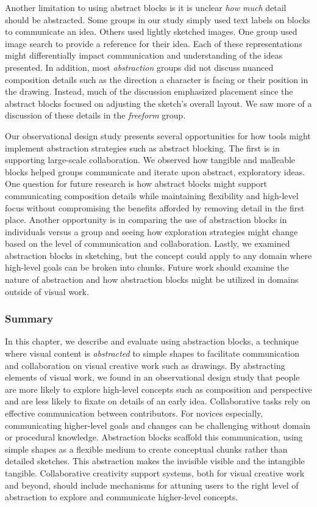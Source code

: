 Another limitation to using abstract blocks is it is unclear \textit{how much} detail should be abstracted. Some groups in our study simply used text labels on blocks to communicate an idea. Others used lightly sketched images. One group used image search to provide a reference for their idea. Each of these representations might differentially impact communication and understanding of the ideas presented. In addition, most \textit{abstraction} groups did not discuss nuanced composition details such as the direction a character is facing or their position in the drawing. Instead, much of the discussion emphasized placement since the abstract blocks focused on adjusting the sketch's overall layout. We saw more of a discussion of these details in the \textit{freeform} group. 

Our observational design study presents several opportunities for how tools might implement abstraction strategies such as abstract blocking. The first is in supporting large-scale collaboration. We observed how tangible and malleable blocks helped groups communicate and iterate upon abstract, exploratory ideas. One question for future research is how abstract blocks might support communicating composition details while maintaining flexibility and high-level focus without compromising the benefits afforded by removing detail in the first place. Another opportunity is in comparing the use of abstraction blocks in individuals versus a group and seeing how exploration strategies might change based on the level of communication and collaboration. Lastly, we examined abstraction blocks in sketching, but the concept could apply to any domain where high-level goals can be broken into chunks. Future work should examine the nature of abstraction and how abstraction blocks might be utilized in domains outside of visual work.

\subsubsection{Summary}
In this chapter, we describe and evaluate using abstraction blocks, a technique where visual content is \emph{abstracted} to simple shapes to facilitate communication and collaboration on visual creative work such as drawings. By abstracting elements of visual work, we found in an observational design study that people are more likely to explore high-level concepts such as composition and perspective and are less likely to fixate on details of an early idea. Collaborative tasks rely on effective communication between contributors. For novices especially, communicating higher-level goals and changes can be challenging without domain or procedural knowledge. Abstraction blocks scaffold this communication, using simple shapes as a flexible medium to create conceptual chunks rather than detailed sketches. This abstraction makes the invisible visible and the intangible tangible. Collaborative creativity support systems, both for visual creative work and beyond, should include mechanisms for attuning users to the right level of abstraction to explore and communicate higher-level concepts.

